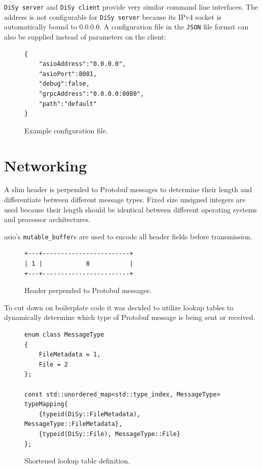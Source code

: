 \documentclass[a4paper]{article}
\begin{document}
\texttt{DiSy server} and \texttt{DiSy client} provide very similar command line interfaces. The address is not configurable for \texttt{DiSy server} because its IPv4 socket is automatically bound to 0.0.0.0.
\bigbreak
A configuration file in the \texttt{JSON} file format can also be supplied instead of parameters on the client:

\begin{figure}[H]
\begin{verbatim}
{
	"asioAddress":"0.0.0.0",
	"asioPort":8081,
	"debug":false,
	"grpcAddress":"0.0.0.0:8080",
	"path":"default"
}
\end{verbatim}
\caption{Example configuration file.}
\end{figure}

\section{Networking}
A slim header is perpended to Protobuf messages to determine their length and differentiate between different message types. Fixed size unsigned integers are used because their length should be identical between different operating systems and processor architectures. 

asio's \texttt{mutable\_buffer}s are used to encode all header fields before transmission.
\begin{figure}[H]
\centering
\begin{BVerbatim}
+---+------------------------+
| 1 |            8           |
+---+------------------------+
\end{BVerbatim}
\caption{Header perpended to Protobuf messages.}
\end{figure}

To cut down on boilerplate code it was decided to utilize lookup tables to dynamically determine which type of Protobuf message is being sent or received. 

\begin{figure}[H]
\begin{verbatim}
enum class MessageType
{
	FileMetadata = 1,
	File = 2
};

const std::unordered_map<std::type_index, MessageType> typeMapping{
	{typeid(DiSy::FileMetadata), MessageType::FileMetadata},
	{typeid(DiSy::File), MessageType::File}
};

\end{verbatim}
\caption{Shortened lookup table definition.}
\end{figure}
\end{document}
